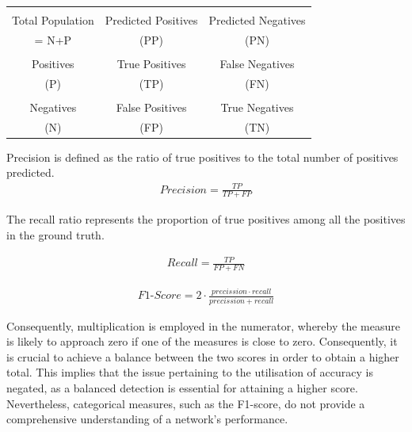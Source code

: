 \documentclass[
a4paper, 
12pt,
grayscalebody, %
abstract=on,
twoside, BCOR10mm, 12pt, DIV13,headinclude, footexclude, final, abstracton, openright
]{ibireprt}
\numberwithin{equation}{chapter}
\numberwithin{table}{chapter}
\numberwithin{figure}{chapter}
\numberwithin{algorithm}{chapter}
\numberwithin{example}{chapter}
\numberwithin{example}{chapter}
\begin{document}
\begin{center}
	\begin{tabular}{c||c|c}
		
		& &\\
		Total Population	& Predicted Positives & Predicted Negatives  	\\
		= N+P & (PP) &(PN)\\
		\hline
		\hline
		& &\\
		Positives &  True Positives& False Negatives   \\
		(P)& (TP)&(FN)\\
		\hline
		& &\\
		Negatives & False Positives  & True Negatives  	\\
		(N)&(FP) &(TN)\\
	\end{tabular}
\end{center}





Precision is defined as the ratio of true positives to the total number of positives predicted.
\begin{align}
	Precision = \frac{TP}{TP+FP}
\end{align}

The recall ratio represents the proportion of true positives among all the positives in the ground truth.

\begin{align}
	Recall = \frac{TP}{FP+FN}
\end{align}

\begin{align}
	F1\text{-}Score = 2\cdot \frac{precission\cdot recall}{precission+recall}
\end{align}

Consequently, multiplication is employed in the numerator, whereby the measure is likely to approach zero if one of the measures is close to zero. Consequently, it is crucial to achieve a balance between the two scores in order to obtain a higher total. This implies that the issue pertaining to the utilisation of accuracy is negated, as a balanced detection is essential for attaining a higher score. Nevertheless, categorical measures, such as the F1-score, do not provide a comprehensive understanding of a network's performance.
\end{document}
